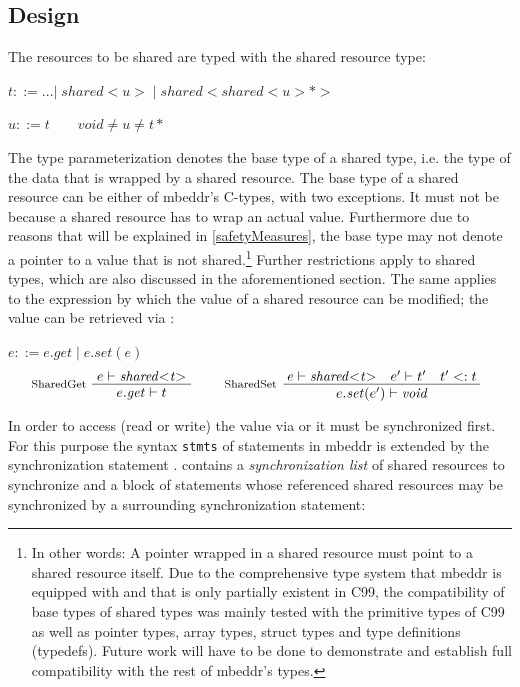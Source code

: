 \subsection{Design}
The resources to be shared are typed with the shared resource type:

$ t ::= ...|\;\mathit{shared{<}u{>}}\;|\;\mathit{shared{<}shared{<}u{>}{*}{>}}\;$

$ u ::= t \qquad \textit{void} \neq u \neq t*$

The type parameterization denotes the base type of a shared type, i.e. the type of the data that is wrapped by a shared resource. The base type of a shared resource can be either of mbeddr's C-types, with two exceptions. It must not be  because a shared resource has to wrap an actual value. Furthermore due to reasons that will be explained in \ref{safetyMeasures}, the base type may not denote a pointer to a value that is not shared.\footnote{In other words: A pointer wrapped in a shared resource must point to a shared resource itself. Due to the comprehensive type system that mbeddr is equipped with and that is only partially existent in C99, the compatibility of base types of shared types was mainly tested with the primitive types of C99 as well as pointer types, array types, struct types and type definitions (typedefs). Future work will have to be done to demonstrate and establish full compatibility with the rest of mbeddr's types.} Further restrictions apply to shared types, which are also discussed in the aforementioned section. The same applies to the  expression by which the value of a shared resource can be modified; the value can be retrieved via :

$ e ::= e.\mathit{get}\;|\;e.\mathit{set(e)} $
\begin{align*}
\inference*[SharedGet]{e |- \mathit{shared{<}t{>}}} {\quad e.\mathit{get} |- t \quad}
\qquad
\inference*[SharedSet]{e |- \mathit{shared{<}t{>}} \quad e' |- t' \quad t' <: t} {\qquad\quad e.\mathit{set}(e') |- \mathit{void} \quad\qquad} 
\end{align*}

In order to access (read or write) the value via  or  it must be synchronized first. For this purpose the syntax \texttt{stmts} of statements in mbeddr is extended by the synchronization statement .  contains a \textit{synchronization list} of shared resources to synchronize and a block of statements whose referenced shared resources may be synchronized by a surrounding synchronization statement:

